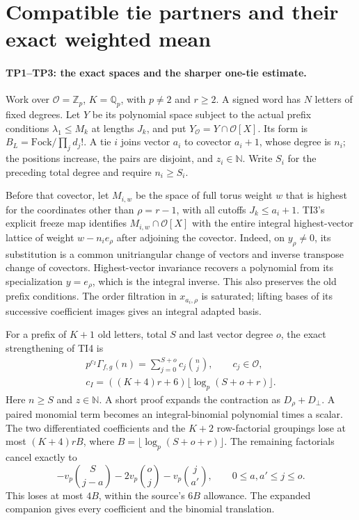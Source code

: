 \section{Compatible tie partners and their exact weighted mean}
\label{sec:tie-partners}


\paragraph{TP1--TP3: the exact spaces and the sharper one-tie estimate.}
Work over $\mathcal O=\mathbb Z_p$, $K=\mathbb Q_p$, with $p\ne2$ and
$r\ge2$. A signed word has $N$ letters of fixed degrees. Let $Y$ be its
polynomial space subject to the actual prefix conditions
$\lambda_1\le M_k$ at lengths $J_k$, and put
$Y_{\mathcal O}=Y\cap\mathcal O[X]$. Its form is
$B_L=\mathrm{Fock}/\prod_jd_j!$.
A tie $i$ joins vector $a_i$ to covector $a_i+1$, whose degree is $n_i$;
the positions increase, the pairs are disjoint, and $z_i\in\mathbb N$.
Write $S_i$ for the preceding total degree and require $n_i\ge S_i$.

Before that covector, let $M_{i,w}$ be the space of full torus weight $w$
that is highest for the coordinates other than $\rho=r-1$, with all
cutoffs $J_k\le a_i+1$. TI3's explicit freeze map identifies
$M_{i,w}\cap\mathcal O[X]$ with the entire integral highest-vector lattice
of weight $w-n_i e_\rho$ after adjoining the covector. Indeed, on
$y_\rho\ne0$, its substitution is a common unitriangular change of vectors
and inverse transpose change of covectors. Highest-vector invariance
recovers a polynomial from its specialization $y=e_\rho$, which is the
integral inverse. This also preserves the old prefix conditions.
The order filtration in $x_{a_i,\rho}$ is saturated; lifting bases of its
successive coefficient images gives an integral adapted basis.

For a prefix of $K+1$ old letters, total $S$ and last vector degree $o$,
the exact strengthening of TI4 is
\[
 \begin{gathered}
 p^{c_I}\Gamma_{f,g}(n)=\sum_{j=0}^{S+o}c_j\binom nj,
 \qquad c_j\in\mathcal O,\\
 c_I=((K+4)r+6)\lfloor\log_p(S+o+r)\rfloor.
 \end{gathered}
 \tag{TP.1}
\]
Here $n\ge S$ and $z\in\mathbb N$. A short proof expands the contraction
as $D_\rho+D_\perp$. A paired monomial term becomes an integral-binomial
polynomial times a scalar. The two differentiated coefficients and the
$K+2$ row-factorial groupings lose at most $(K+4)rB$, where
$B=\lfloor\log_p(S+o+r)\rfloor$. The remaining factorials cancel exactly to
\[
 -v_p\binom S{j-a}-2v_p\binom oj-v_p\binom j{a'},
 \qquad 0\le a,a'\le j\le o.
\]
This loses at most $4B$, within the source's $6B$ allowance. The expanded
companion gives every coefficient and the binomial translation.

